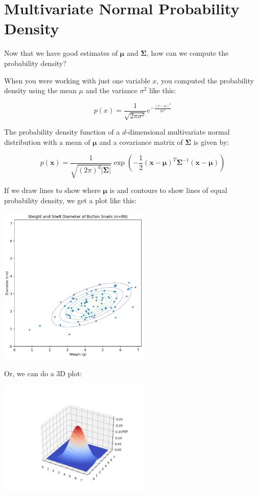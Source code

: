 \section{Multivariate Normal Probability Density}

Now that we have good estimates of $\boldsymbol\mu$ and $\mathbf{\Sigma}$, how can we compute the probability density?

When you were working with just one variable $x$, you computed the probability density using the mean $\mu$ and the variance $\sigma^2$ like this:

\begin{equation*}
p(x) = \frac{1}{\sqrt{2\pi\sigma^2}} e^{-\frac{(x - \mu)^2}{2\sigma^2}}
\end{equation*}

The probability density function of a $d$-dimensional
multivariate normal distribution with a mean of $\boldsymbol\mu$ and a covariance matrix of $\mathbf{\Sigma}$ is given by:

\begin{equation*}
p(\mathbf{x}) = \frac{1}{\sqrt{(2\pi)^d|\mathbf{\Sigma}|}}\exp\left(-\frac{1}{2}(\mathbf{x}-\boldsymbol\mu)^T\mathbf{\Sigma}^{-1}(\mathbf{x}-\boldsymbol\mu)\right)
\end{equation*}

If we draw lines to show where $\boldsymbol\mu$ is and contours to show lines of equal probability density, we get a plot like this:

\includegraphics[width=0.55\textwidth]{contour.png}

Or, we can do a 3D plot:

\includegraphics[width=0.55\textwidth]{3d.png}

